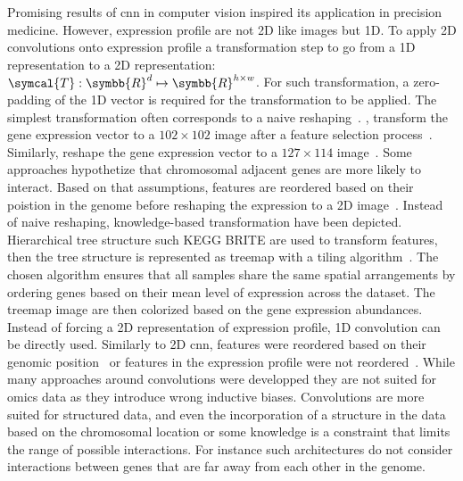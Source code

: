 \documentclass[../main.tex]{subfiles}
\begin{document}
	Promising results of \gls{cnn} in computer vision inspired its application in precision medicine.
	However, expression profile are not 2D like images but 1D.
	To apply 2D convolutions onto expression profile a transformation step to go from a 1D representation to a 2D representation: \(\symcal{T}: \symbb{R}^{d} \mapsto \symbb{R}^{h\times w}\).
	For such transformation, a zero-padding of the 1D vector is required for the transformation to be applied.
	The simplest transformation often corresponds to a naive reshaping~\cite{Wang2021,deGuia2019,Elbashir2019,Chatterjee2018}\@. \citeauthor{deGuia2019}, transform the gene expression vector to a \(102\times 102\) image after a feature selection process~\cite{deGuia2019}.
	Similarly, \citeauthor{Elbashir2019} reshape the gene expression vector to a \(127 \times 114\) image~\cite{Elbashir2019}.
	Some approaches hypothetize that chromosomal adjacent genes are more likely to interact.
	Based on that assumptions, features are reordered based on their poistion in the genome before reshaping the expression to a 2D image~\cite{Mostavi2020,Lyu2018,Yin2022}.
	Instead of naive reshaping, knowledge-based transformation have been depicted.
	Hierarchical tree structure such KEGG BRITE are used to transform features, then the tree structure is represented as treemap with a tiling algorithm~\cite{LpezGarca2020,maOmicsMapNetTransformingOmics2019}.
	The chosen algorithm ensures that all samples share the same spatial arrangements by ordering genes based on their mean level of expression across the dataset.
	The treemap image are then colorized based on the gene expression abundances.
	Instead of forcing a 2D representation of expression profile, 1D convolution can be directly used.
	Similarly to 2D \gls{cnn}, features were reordered based on their genomic position~\cite{Mostavi2020,Zhao2020,Yin2022} or features in the expression profile were not reordered~\cite{Mohammed2021}.
	While many approaches around convolutions were developped they are not suited for omics data as they introduce wrong inductive biases.
	Convolutions are more suited for structured data, and even the incorporation of a structure in the data based on the chromosomal location or some knowledge is a constraint that limits the range of possible interactions.
	For instance such architectures do not consider interactions between genes that are far away from each other in the genome.
\end{document}
